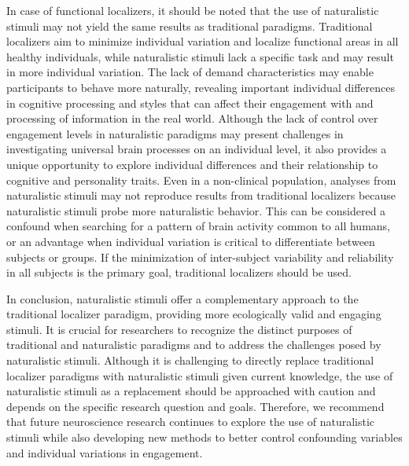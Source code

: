 %
In case of functional localizers, it should be noted that the use of
naturalistic stimuli may not yield the same results as traditional paradigms.
%
Traditional localizers aim to minimize individual variation and localize
functional areas in all healthy individuals, while naturalistic stimuli lack a
specific task and may result in more individual variation.
%
The lack of demand characteristics may enable participants to behave more
naturally, revealing important individual differences in cognitive processing
and styles that can affect their engagement with and processing of information
in the real world.
%
Although the lack of control over engagement levels in naturalistic paradigms
may present challenges in investigating universal brain processes on an
individual level, it also provides a unique opportunity to explore individual
differences and their relationship to cognitive and personality traits.
%
Even in a non-clinical population, analyses from naturalistic stimuli may not
reproduce results from traditional localizers because naturalistic stimuli probe
more naturalistic behavior.
%
This can be considered a confound when searching for a pattern of brain activity
common to all humans, or an advantage when individual variation is critical to
differentiate between subjects or groups.
%
If the minimization of inter-subject variability and reliability in all subjects
is the primary goal, traditional localizers should be used.

%
In conclusion, naturalistic stimuli offer a complementary approach to the
traditional localizer paradigm, providing more ecologically valid and engaging
stimuli.
%
It is crucial for researchers to recognize the distinct purposes of traditional
and naturalistic paradigms and to address the challenges posed by naturalistic
stimuli.
%
Although it is challenging to directly replace traditional localizer paradigms
with naturalistic stimuli given current knowledge, the use of naturalistic
stimuli as a replacement should be approached with caution and depends on the
specific research question and goals.
%
Therefore, we recommend that future neuroscience research continues to explore
the use of naturalistic stimuli while also developing new methods to better
control confounding variables and individual variations in engagement.





